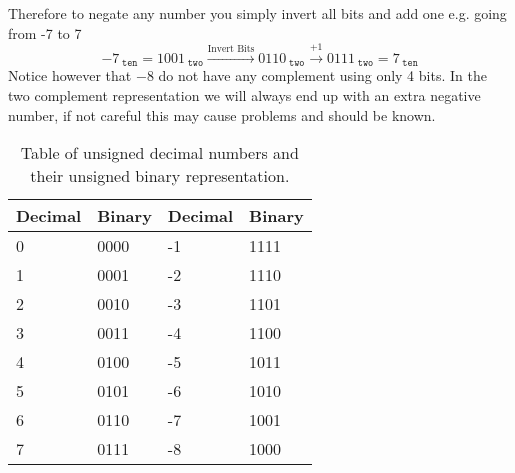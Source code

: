         Therefore to negate any number you simply invert all bits and add one e.g. going from -7 to 7
        \begin{equation}\label{Eq:Negationshortcut}
            -7_{\; \texttt{ten}} = 1001_{\; \texttt{two}} \xrightarrow{\text{Invert Bits}} 0110_{\; \texttt{two}} \xrightarrow{\text{+1}} 0111_{\; \texttt{two}} = 7_{\; \texttt{ten}}
        \end{equation}
        Notice however that $-8$ do not have any complement using only 4 bits. In the two complement representation we will always end up with an extra negative number, if not careful this may cause problems and should be known.
        
        \begin{table}[h!]
            \centering
            \begin{tabular}{|l|l||l|l|}
            	\hline
            	Decimal & Binary & Decimal & Binary \\ \hline
            	0       & 0000   & -1      & 1111   \\
            	1       & 0001   & -2      & 1110   \\
            	2       & 0010   & -3      & 1101   \\
            	3       & 0011   & -4      & 1100   \\
            	4       & 0100   & -5      & 1011   \\
            	5       & 0101   & -6      & 1010   \\
            	6       & 0110   & -7      & 1001   \\
            	7       & 0111   & -8      & 1000   \\ \hline
            \end{tabular}
            \caption{Table of unsigned decimal numbers and their unsigned binary representation.}
            \label{table:DecimalToBinarySigned}
        \end{table}
    
